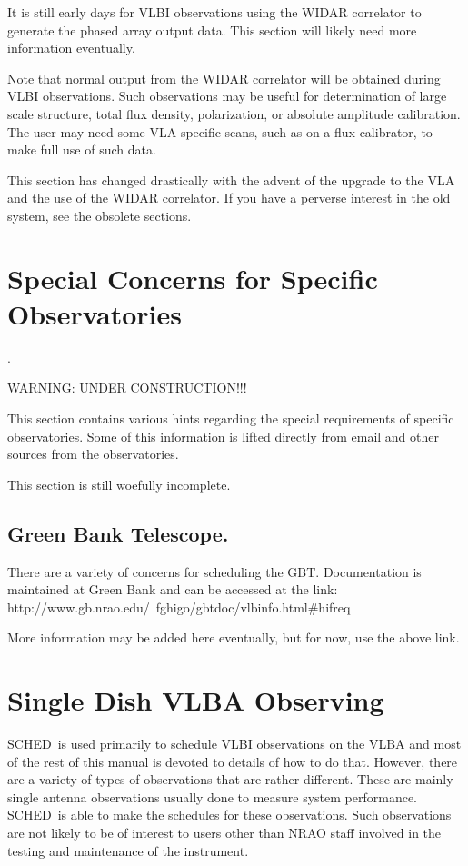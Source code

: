 \documentclass{report}
\newcommand{\schedb}{{\sc SCHED~}}
\begin{document}
It is still early days for VLBI observations using the WIDAR correlator
to generate the phased array output data.  This section will likely
need more information eventually.

Note that normal output from the WIDAR correlator will be obtained during
VLBI observations.  Such observations may be useful for determination 
of large scale structure, total flux density, polarization, or absolute
amplitude calibration.  The user may need some VLA specific scans, such
as on a flux calibrator, to make full use of such data.

This section has changed drastically with the advent of the upgrade
to the VLA and the use of the WIDAR correlator.  If you have a perverse
interest in the old system, see the obsolete sections.


\section{\label{SEC:INDIV}Special Concerns for Specific Observatories}.

WARNING:  UNDER CONSTRUCTION!!!

This section contains various hints regarding the special requirements
of specific observatories.  Some of this information is lifted directly
from email and other sources from the observatories.

This section is still woefully incomplete.


\subsection{\label{SSEC:GBT}Green Bank Telescope.}

There are a variety of concerns for scheduling the GBT.  Documentation
is maintained at Green Bank and can be accessed at the link:
{http://www.gb.nrao.edu/~fghigo/gbtdoc/vlbinfo.html\#hifreq}

More information may be added here eventually, but for now, use the
above link.

\section{\label{SEC:SPECIALVLBA}Single Dish VLBA Observing}

\schedb is used primarily to schedule VLBI observations on the VLBA
and most of the rest of this manual is devoted to details of how to
do that.  However, there are a variety of types of observations that
are rather different.  These are mainly single antenna observations
usually done to measure system performance.  \schedb is able to
make the schedules for these observations.  Such observations are
not likely to be of interest to users other than NRAO staff involved
in the testing and maintenance of the instrument.
\end{document}
